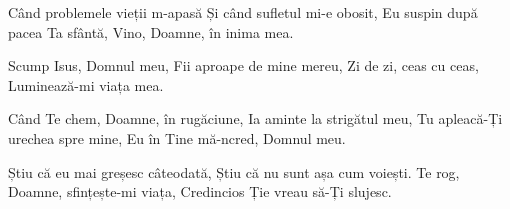 \beginverse
Când problemele vieții m-apasă
Și când sufletul mi-e obosit,
Eu suspin după pacea Ta sfântă,
Vino, Doamne, în inima mea.
\endverse

\beginchorus
Scump Isus, Domnul meu,
Fii aproape de mine mereu,
Zi de zi, ceas cu ceas,
Luminează-mi viața mea.
\endchorus

\beginverse
Când Te chem, Doamne, în rugăciune,
Ia aminte la strigătul meu,
Tu apleacă-Ți urechea spre mine,
Eu în Tine mă-ncred, Domnul meu.
\endverse

\beginverse
Știu că eu mai greșesc câteodată,
Știu că nu sunt așa cum voiești.
Te rog, Doamne, sfințește-mi viața,
Credincios Ție vreau să-Ți slujesc.
\endverse
\endsong